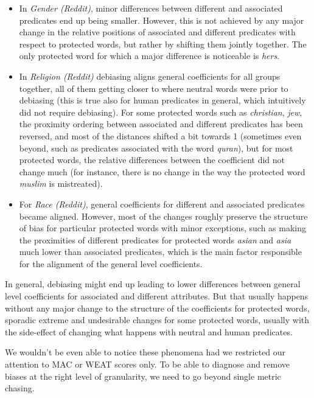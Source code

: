 \documentclass{clv3}
\begin{document}
\begin{itemize}
\item
  In \emph{Gender (Reddit)}, minor differences between different and
  associated predicates end up being smaller. However, this is not
  achieved by any major change in the relative positions of associated
  and different predicates with respect to protected words, but rather
  by shifting them jointly together. The only protected word for which a
  major difference is noticeable is \emph{hers}.
\item
  In \emph{Religion (Reddit)} debiasing aligns general coefficients for
  all groups together, all of them getting closer to where neutral words
  were prior to debiasing (this is true also for human predicates in
  general, which intuitively did not require debiasing). For some
  protected words such as \emph{christian}, \emph{jew}, the proximity
  ordering between associated and different predicates has been
  reversed, and most of the distances shifted a bit towards 1 (sometimes
  even beyond, such as predicates associated with the word
  \emph{quran}), but for most protected words, the relative differences
  between the coefficient did not change much (for instance, there is no
  change in the way the protected word \emph{muslim} is mistreated).
\item
  For \emph{Race (Reddit)}, general coefficients for different and
  associated predicates became aligned. However, most of the changes
  roughly preserve the structure of bias for particular protected words
  with minor exceptions, such as making the proximities of different
  predicates for protected words \emph{asian} and \emph{asia} much lower
  than associated predicates, which is the main factor responsible for
  the alignment of the general level coefficients.
\end{itemize}

In general, debiasing might end up leading to lower differences between
general level coefficients for associated and different attributes. But
that usually happens without any major change to the structure of the
coefficients for protected words, sporadic extreme and undesirable
changes for some protected words, usually with the side-effect of
changing what happens with neutral and human predicates.

We wouldn't be even able to notice these phenomena had we restricted our
attention to \textsf{MAC} or \textsf{WEAT} scores only. To be able to
diagnose and remove biases at the right level of granularity, we need to
go beyond single metric chasing.
\end{document}
